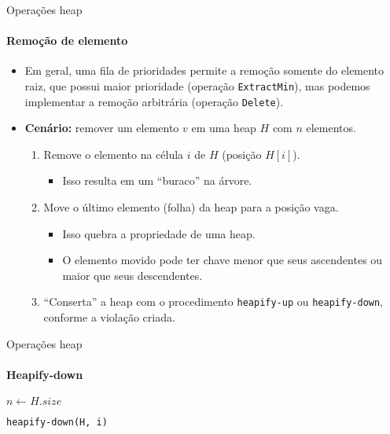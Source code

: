 \begin{frame}{Operações heap}
\framesubtitle{Remoção de elemento}

\begin{itemize}
	\item Em geral, uma fila de prioridades permite a remoção somente do elemento raiz, que possui maior prioridade (operação \texttt{ExtractMin}), mas podemos implementar a remoção arbitrária (operação \texttt{Delete}).
	
	\item \textbf{Cenário:} remover um elemento $v$ em uma heap $H$ com $n$ elementos.
	
	
	\begin{enumerate}
		\item Remove o elemento na célula $i$ de $H$ (posição $H[i]$).
		\begin{itemize}
			\item Isso resulta em um ``buraco'' na árvore.
		\end{itemize}
	
		\item Move o último elemento (folha) da heap para a posição vaga.
		\begin{itemize}
			\item Isso quebra a propriedade de uma heap.
			\item O elemento movido pode ter chave menor que seus ascendentes ou maior que seus descendentes.
		\end{itemize}
		\item ``Conserta'' a heap com o procedimento \texttt{heapify-up} ou \texttt{heapify-down}, conforme a violação criada.
	\end{enumerate}
\end{itemize}
\end{frame}



\begin{frame}{Operações heap}
\framesubtitle{Heapify-down}

\begin{algorithm}[H]
	\DontPrintSemicolon
	
	$n \gets H.size$\;

	
	\caption{\texttt{heapify-down(H,\,i)}}
\end{algorithm}
\end{frame}



